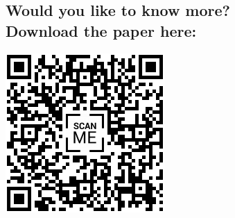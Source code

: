 \documentclass[a0,landscape]{a0poster}
\begin{document}
\begin{multicols}{4}
\section*{Would you like to know more?\\Download the paper here:}
\begin{center}
\includegraphics[width=.4\linewidth]{qr_pdf.png}
\end{center}





\color{Black} %
\begin{tiny}
\setlength{\parskip}{-5pt}


\end{tiny}




\end{multicols}
\end{document}
